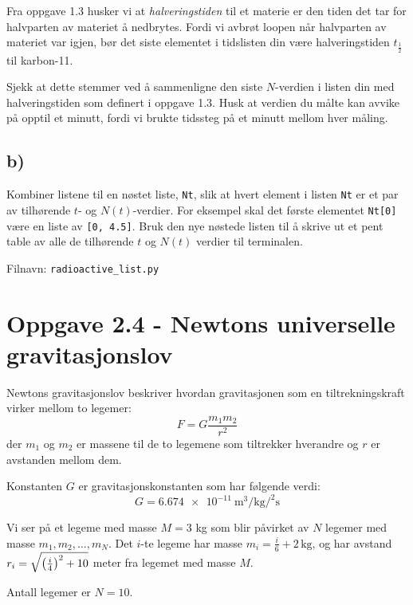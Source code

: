 \documentclass[10pt,a4paper]{article}
\newcommand{\halflife}{t_{\frac{1}{2}}}
\begin{document}
Fra oppgave 1.3 husker vi at \textit{halveringstiden} til et materie er den tiden det tar for halvparten av materiet å nedbrytes. Fordi vi avbrøt loopen når halvparten av materiet var igjen, bør det siste elementet i tidslisten din være halveringstiden $\halflife$ til karbon-11.
 
Sjekk at dette stemmer ved å sammenligne den siste $N$-verdien i listen din med halveringstiden som definert i oppgave 1.3. Husk at verdien du målte kan avvike på opptil et minutt, fordi vi brukte tidssteg på et minutt mellom hver måling.
 
 
\subsection*{b)}
Kombiner listene til en nøstet liste, \texttt{Nt}, slik at hvert element i listen \texttt{Nt} er et par av tilhørende $t$- og $N(t)$-verdier. For eksempel skal det første elementet \texttt{Nt[0]} være en liste av \texttt{[0,\ 4.5]}. Bruk den nye nøstede listen til å skrive ut et pent table av alle de tilhørende $t$ og $N(t)$ verdier til terminalen.
 
Filnavn: \texttt{radioactive\_list.py}
 
 
 
 
 
	\section*{Oppgave 2.4 - Newtons universelle gravitasjonslov}
	Newtons gravitasjonslov beskriver hvordan gravitasjonen som en tiltrekningskraft virker mellom to legemer:
	\begin{equation*}
		F = G\frac{m_1m_2}{r^2}
	\end{equation*}
	der $m_1$ og $m_2$ er massene til de to legemene som tiltrekker hverandre og $r$ er avstanden mellom dem. 
	
	Konstanten $G$ er gravitasjonskonstanten som har følgende verdi:
	\[
	G = \SI{6.674e-11}{\cubic\meter\per\kilogram\per\squared\second}
	\]
	
	
	Vi ser på et legeme med masse $M = 3$ kg som blir påvirket av $N$ legemer med masse $m_1,m_2,\dots,m_N$. Det $i$-te legeme har masse $m_i = \frac{i}{6}+2\,\mathrm{kg}$, og har avstand $r_i = \sqrt{\qty(\frac{i}{4})^2 + 10}$ meter fra legemet med masse $M$.  
	
	Antall legemer er $N = 10$.
	
\end{document}

